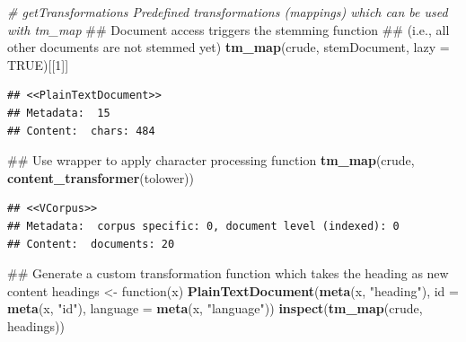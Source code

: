 \documentclass[]{book}
\newenvironment{Shaded}{\begin{snugshade}}{\end{snugshade}}
\newcommand{\KeywordTok}[1]{\textcolor[rgb]{0.13,0.29,0.53}{\textbf{{#1}}}}
\newcommand{\DataTypeTok}[1]{\textcolor[rgb]{0.13,0.29,0.53}{{#1}}}
\newcommand{\DecValTok}[1]{\textcolor[rgb]{0.00,0.00,0.81}{{#1}}}
\newcommand{\StringTok}[1]{\textcolor[rgb]{0.31,0.60,0.02}{{#1}}}
\newcommand{\CommentTok}[1]{\textcolor[rgb]{0.56,0.35,0.01}{\textit{{#1}}}}
\newcommand{\OtherTok}[1]{\textcolor[rgb]{0.56,0.35,0.01}{{#1}}}
\newcommand{\NormalTok}[1]{{#1}}
\begin{document}
\begin{Shaded}
\begin{Highlighting}[]
\CommentTok{# getTransformations  Predefined transformations (mappings) which can be used with tm_map}
\NormalTok{## Document access triggers the stemming function}
\NormalTok{## (i.e., all other documents are not stemmed yet)}
\KeywordTok{tm_map}\NormalTok{(crude, stemDocument, }\DataTypeTok{lazy =} \OtherTok{TRUE}\NormalTok{)[[}\DecValTok{1}\NormalTok{]]}
\end{Highlighting}
\end{Shaded}

\begin{verbatim}
## <<PlainTextDocument>>
## Metadata:  15
## Content:  chars: 484
\end{verbatim}

\begin{Shaded}
\begin{Highlighting}[]
\NormalTok{## Use wrapper to apply character processing function}
\KeywordTok{tm_map}\NormalTok{(crude, }\KeywordTok{content_transformer}\NormalTok{(tolower))}
\end{Highlighting}
\end{Shaded}

\begin{verbatim}
## <<VCorpus>>
## Metadata:  corpus specific: 0, document level (indexed): 0
## Content:  documents: 20
\end{verbatim}

\begin{Shaded}
\begin{Highlighting}[]
\NormalTok{## Generate a custom transformation function which takes the heading as new content}
\NormalTok{headings <-}\StringTok{ }\NormalTok{function(x)}
\KeywordTok{PlainTextDocument}\NormalTok{(}\KeywordTok{meta}\NormalTok{(x, }\StringTok{"heading"}\NormalTok{), }\DataTypeTok{id =} \KeywordTok{meta}\NormalTok{(x, }\StringTok{"id"}\NormalTok{),}
                  \DataTypeTok{language =} \KeywordTok{meta}\NormalTok{(x, }\StringTok{"language"}\NormalTok{))}
\KeywordTok{inspect}\NormalTok{(}\KeywordTok{tm_map}\NormalTok{(crude, headings))}
\end{Highlighting}
\end{Shaded}
\end{document}
